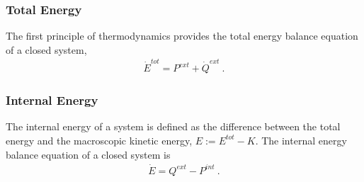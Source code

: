 \documentclass[letterpaper,10pt,english]{jupyterBook}
\begin{document}
\subsubsection{Total Energy}
\label{\detokenize{ch/circuits-electromechanic:total-energy}}
\sphinxAtStartPar
The first principle of thermodynamics provides the total energy balance equation of a closed system,
\begin{equation*}
\begin{split}\dot{E}^{tot} = P^{ext} + \dot{Q}^{ext} \ .\end{split}
\end{equation*}

\subsubsection{Internal Energy}
\label{\detokenize{ch/circuits-electromechanic:internal-energy}}
\sphinxAtStartPar
The internal energy of a system is defined as the difference between the total energy and the macroscopic kinetic energy, \(E := E^{tot} - K\). The internal energy balance equation of a closed system is
\begin{equation*}
\begin{split}\dot{E} = Q^{ext} - P^{int} \ .\end{split}
\end{equation*}
\end{document}
